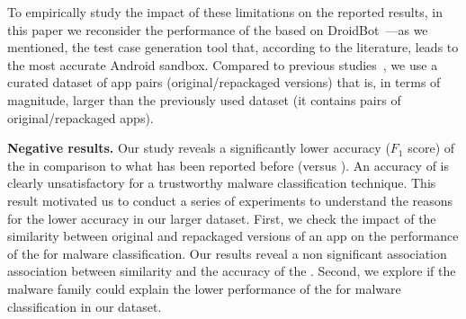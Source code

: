 

To empirically study the impact of these limitations on the reported results, in this paper we reconsider the performance of the \mas based on
DroidBot~\cite{DBLP:conf/icse/LiYGC17}---as we mentioned, the test case generation tool that, according to the literature, leads to the most accurate Android sandbox. 
Compared to previous studies~\cite{DBLP:conf/wcre/BaoLL18,DBLP:conf/scam/CostaMCMVBC20},
we use a curated dataset of app pairs (original/repackaged versions) that is, in terms of magnitude, larger than the previously used
dataset (it contains \apps pairs of original/repackaged apps).
 
{\bf Negative results.} Our study reveals a significantly lower
accuracy ($F_1$ score) of the \mas in comparison to what has been reported before (\fscore versus \fscoreSmall). 
An accuracy of \fscore is clearly unsatisfactory for a trustworthy malware classification technique.
This result motivated us to conduct a series of experiments 
to understand the reasons for the lower accuracy in our larger dataset.
First, we check the impact of the similarity between original and repackaged versions of
an app on the performance of the \mas for malware classification. Our results reveal a non significant association association between similarity and the accuracy of the \mas. 
Second, we explore if the
malware family could explain the lower performance of the \mas for malware classification in 
our dataset.

